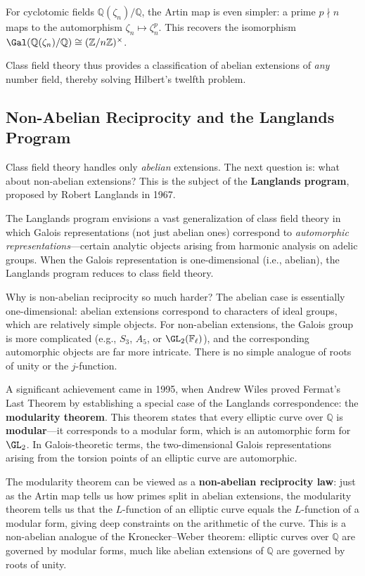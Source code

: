 For cyclotomic fields $\mathbb{Q}(\zeta_n)/\mathbb{Q}$, the Artin map is even simpler: a prime $p \nmid n$ maps to the automorphism $\zeta_n \mapsto \zeta_n^p$. This recovers the isomorphism $\Gal(\mathbb{Q}(\zeta_n)/\mathbb{Q}) \cong (\mathbb{Z}/n\mathbb{Z})^\times$.

Class field theory thus provides a classification of abelian extensions of \emph{any} number field, thereby solving Hilbert's twelfth problem.

\subsection{Non-Abelian Reciprocity and the Langlands Program}

Class field theory handles only \emph{abelian} extensions. The next question is: what about non-abelian extensions? This is the subject of the \textbf{Langlands program}, proposed by Robert Langlands in 1967.

The Langlands program envisions a vast generalization of class field theory in which Galois representations (not just abelian ones) correspond to \emph{automorphic representations}---certain analytic objects arising from harmonic analysis on adelic groups. When the Galois representation is one-dimensional (i.e., abelian), the Langlands program reduces to class field theory.

Why is non-abelian reciprocity so much harder? The abelian case is essentially one-dimensional: abelian extensions correspond to characters of ideal groups, which are relatively simple objects. For non-abelian extensions, the Galois group is more complicated (e.g., $S_3$, $A_5$, or $\GL_2(\mathbb{F}_\ell)$), and the corresponding automorphic objects are far more intricate. There is no simple analogue of roots of unity or the $j$-function.

A significant achievement came in 1995, when Andrew Wiles proved Fermat's Last Theorem by establishing a special case of the Langlands correspondence: the \textbf{modularity theorem}. This theorem states that every elliptic curve over $\mathbb{Q}$ is \textbf{modular}---it corresponds to a modular form, which is an automorphic form for $\GL_2$. In Galois-theoretic terms, the two-dimensional Galois representations arising from the torsion points of an elliptic curve are automorphic.

The modularity theorem can be viewed as a \textbf{non-abelian reciprocity law}: just as the Artin map tells us how primes split in abelian extensions, the modularity theorem tells us that the $L$-function of an elliptic curve equals the $L$-function of a modular form, giving deep constraints on the arithmetic of the curve. This is a non-abelian analogue of the Kronecker--Weber theorem: elliptic curves over $\mathbb{Q}$ are governed by modular forms, much like abelian extensions of $\mathbb{Q}$ are governed by roots of unity.

